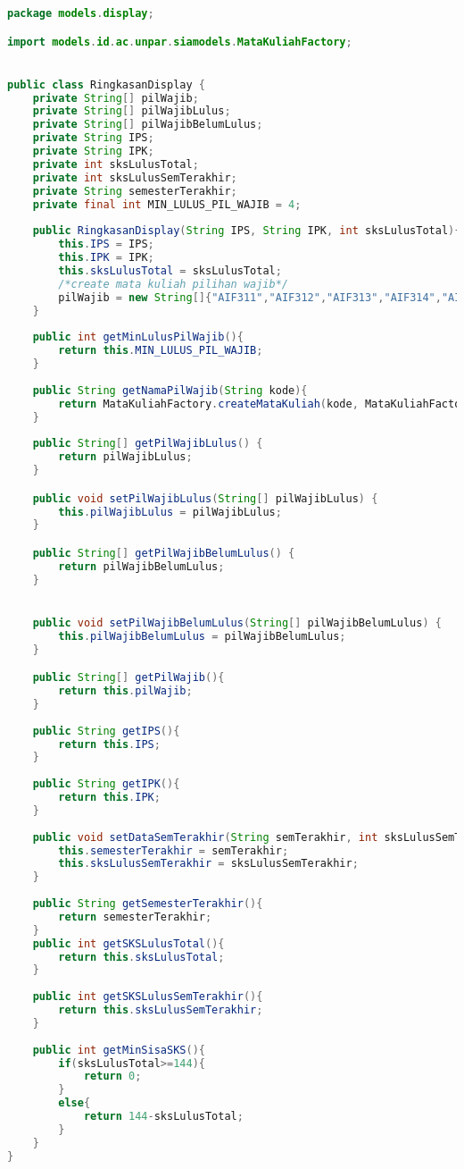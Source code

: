 \singlespacing 
\begin{lstlisting}[language=Java,basicstyle=\tiny,caption=RingkasanDisplay.java]
	package models.display;

import models.id.ac.unpar.siamodels.MataKuliahFactory;


public class RingkasanDisplay {
	private String[] pilWajib;
	private String[] pilWajibLulus;
	private String[] pilWajibBelumLulus;
	private String IPS;
	private String IPK;
	private int sksLulusTotal;
	private int sksLulusSemTerakhir;
	private String semesterTerakhir;
	private final int MIN_LULUS_PIL_WAJIB = 4;
	
	public RingkasanDisplay(String IPS, String IPK, int sksLulusTotal){
		this.IPS = IPS;
		this.IPK = IPK;
		this.sksLulusTotal = sksLulusTotal;
		/*create mata kuliah pilihan wajib*/
		pilWajib = new String[]{"AIF311","AIF312","AIF313","AIF314","AIF315","AIF316","AIF317","AIF318"}; 
	}
	
	public int getMinLulusPilWajib(){
		return this.MIN_LULUS_PIL_WAJIB;
	}
	
	public String getNamaPilWajib(String kode){
		return MataKuliahFactory.createMataKuliah(kode, MataKuliahFactory.UNKNOWN_SKS, MataKuliahFactory.UNKNOWN_NAMA).nama()+"";
	}
	
	public String[] getPilWajibLulus() {
		return pilWajibLulus;
	}

	public void setPilWajibLulus(String[] pilWajibLulus) {
		this.pilWajibLulus = pilWajibLulus;
	}

	public String[] getPilWajibBelumLulus() {
		return pilWajibBelumLulus;
	}


	public void setPilWajibBelumLulus(String[] pilWajibBelumLulus) {
		this.pilWajibBelumLulus = pilWajibBelumLulus;
	}

	public String[] getPilWajib(){
		return this.pilWajib;
	}
	
	public String getIPS(){
		return this.IPS;
	}
	
	public String getIPK(){
		return this.IPK;
	}
	
	public void setDataSemTerakhir(String semTerakhir, int sksLulusSemTerakhir) {
		this.semesterTerakhir = semTerakhir;
		this.sksLulusSemTerakhir = sksLulusSemTerakhir;
	}
	
	public String getSemesterTerakhir(){
		return semesterTerakhir;
	}
	public int getSKSLulusTotal(){
		return this.sksLulusTotal;
	}
	
	public int getSKSLulusSemTerakhir(){
		return this.sksLulusSemTerakhir;
	}
	
	public int getMinSisaSKS(){
		if(sksLulusTotal>=144){
			return 0;
		}
		else{
			return 144-sksLulusTotal;
		}
	}
}
\end{lstlisting}

